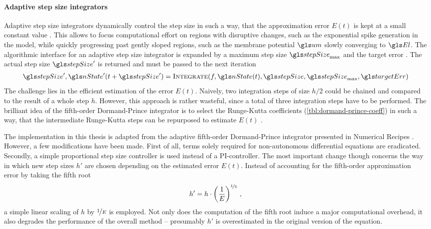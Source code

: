 \paragraph{Adaptive step size integrators}
Adaptive step size integrators dynamically control the step size \stepSize in such a way, that the approximation error $E(t)$ is kept at a small constant value \targetErr. This allows to focus computational effort on regions with disruptive changes, such as the exponential spike generation in the \AdEx model, while quickly progressing past gently sloped regions, such as the membrane potential $\um$ slowly converging to $\El$. The algorithmic interface for an adaptive step size integrator is expanded by a maximum step size $\stepSize_\mathrm{max}$ and the target error \targetErr. The actual step size $\stepSize'$ is returned and must be passed to the next iteration
\begin{align}
	\stepSize', \nState'(t + \stepSize') = \textsc{Integrate}(f, \nState(t), \stepSize, \stepSize_\mathrm{max}, \targetErr)
\end{align}
The challenge lies in the efficient estimation of the error $E(t)$. Naively, two integration steps of size $h/2$ could be chained and compared to the result of a whole step $h$. However, this approach is rather wasteful, since a total of three integration steps have to be performed. The brilliant idea of the fifth-order Dormand-Prince integrator is to select the Runge-Kutta coefficients (\cref{tbl:dormand-prince-coeff}) in such a way, that the intermediate Runge-Kutta steps can be repurposed to estimate $E(t)$ \cite{dormand1980family}.

The implementation in this thesis is adapted from the adaptive fifth-order Dormand-Prince integrator presented in Numerical Recipes \cite{press2007numerical}. However, a few modifications have been made. First of all, terms  solely required for non-autonomous differential equations are eradicated. Secondly, a simple proportional step size controller is used instead of a PI-controller. The most important change though concerns the way in which new step sizes $h'$ are chosen depending on the estimated error $E(t)$. Instead of accounting for the fifth-order approximation error by taking the fifth root
\begin{align}
	h' = h \cdot \left(\frac{1}{E}\right)^{\nicefrac{1}5} \,,
\end{align}
a simple linear scaling of $h$ by $\nicefrac{1}{E}$ is employed. Not only does the computation of the fifth root induce a major computational overhead, it also degrades the performance of the overall method -- presumably $h'$ is overestimated in the original version of the equation.

